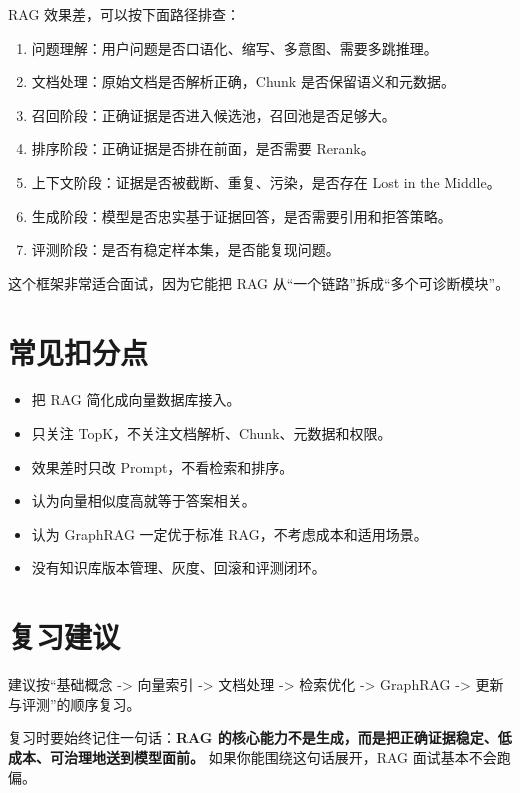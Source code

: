 \documentclass[9pt,a4paper,twocolumn]{ctexart}
\begin{document}
RAG 效果差，可以按下面路径排查：


\begin{enumerate}[itemsep=1pt, topsep=2pt]
  \item 问题理解：用户问题是否口语化、缩写、多意图、需要多跳推理。
  \item 文档处理：原始文档是否解析正确，Chunk 是否保留语义和元数据。
  \item 召回阶段：正确证据是否进入候选池，召回池是否足够大。
  \item 排序阶段：正确证据是否排在前面，是否需要 Rerank。
  \item 上下文阶段：证据是否被截断、重复、污染，是否存在 Lost in the Middle。
  \item 生成阶段：模型是否忠实基于证据回答，是否需要引用和拒答策略。
  \item 评测阶段：是否有稳定样本集，是否能复现问题。
\end{enumerate}


这个框架非常适合面试，因为它能把 RAG 从“一个链路”拆成“多个可诊断模块”。



\section*{常见扣分点}

\begin{itemize}[itemsep=1pt, topsep=2pt]
  \item 把 RAG 简化成向量数据库接入。
  \item 只关注 TopK，不关注文档解析、Chunk、元数据和权限。
  \item 效果差时只改 Prompt，不看检索和排序。
  \item 认为向量相似度高就等于答案相关。
  \item 认为 GraphRAG 一定优于标准 RAG，不考虑成本和适用场景。
  \item 没有知识库版本管理、灰度、回滚和评测闭环。
\end{itemize}


\section*{复习建议}


建议按“基础概念 -> 向量索引 -> 文档处理 -> 检索优化 -> GraphRAG -> 更新与评测”的顺序复习。



复习时要始终记住一句话：\textbf{RAG 的核心能力不是生成，而是把正确证据稳定、低成本、可治理地送到模型面前。} 如果你能围绕这句话展开，RAG 面试基本不会跑偏。
\end{document}
